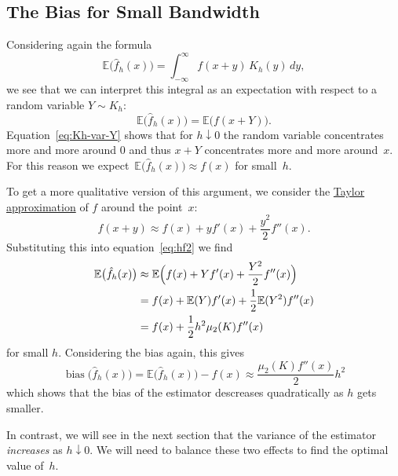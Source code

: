 \documentclass[
  a4paper,
]{article}
\theoremstyle{definition}
\theoremstyle{definition}
\theoremstyle{definition}
\theoremstyle{definition}
\theoremstyle{remark}
\begin{document}
\subsection{The Bias for Small Bandwidth}\label{the-bias-for-small-bandwidth}

Considering again the formula
\begin{equation*}
    \mathbb{E}\bigl(\hat f_h(x)\bigr)
    = \int_{-\infty}^\infty f(x+y) \, K_h(y) \, dy,
\end{equation*}
we see that we can interpret this integral as an expectation
with respect to a random variable \(Y \sim K_h\):
\begin{equation}
    \mathbb{E}\bigl(\hat f_h(x)\bigr)
    = \mathbb{E}\bigl( f(x+Y) \bigr).  \label{eq:hf2}
\end{equation}
Equation~\eqref{eq:Kh-var-Y} shows that for \(h \downarrow 0\) the random
variable concentrates more and more around \(0\) and thus \(x+Y\) concentrates
more and more around~\(x\). For this reason we
expect~\(\mathbb{E}\bigl(\hat f_h(x)\bigr) \approx f(x)\) for small~\(h\).

To get a more qualitative version of this argument, we consider the
\href{https://en.wikipedia.org/wiki/Taylor\%27s_theorem}{Taylor approximation}
of \(f\) around the point~\(x\):
\begin{equation*}
  f(x + y)
  \approx f(x) + y f'(x) + \frac{y^2}{2} f''(x).
\end{equation*}
Substituting this into equation~\eqref{eq:hf2} we find
\begin{align*}
    \mathbb{E}\bigl(\hat f_h(x)\bigr)
    &\approx \mathbb{E}\Bigl( f(x) + Y f'(x) + \frac{Y^2}{2} f''(x) \Bigr) \\
    &= f(x) + \mathbb{E}(Y) f'(x) + \frac12 \mathbb{E}(Y^2) f''(x) \\
    &= f(x) + \frac12 h^2 \mu_2(K) f''(x)
\end{align*}
for small \(h\). Considering the bias again, this gives
\begin{equation}
  \mathop{\mathrm{bias}}\bigl( \hat f_h(x) \bigr)
  = \mathbb{E}\bigl( \hat f_h(x) \bigr) - f(x)
  \approx \frac{\mu_2(K) f''(x)}{2} h^2  \label{eq:fhatbias}
\end{equation}
which shows that the bias of the estimator descreases quadratically
as \(h\) gets smaller.

In contrast, we will see in the next section that the variance of the
estimator \emph{increases} as \(h \downarrow 0\). We will need to balance these
two effects to find the optimal value of~\(h\).
\end{document}
